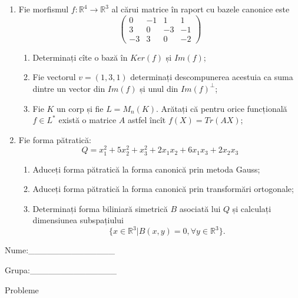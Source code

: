 \documentclass{article}
\begin{document}
\begin{enumerate}
 \item Fie morfismul $f:\mathbb{R}^4 \to \mathbb{R}^3$ al cărui matrice în raport cu bazele canonice este
$$\begin{pmatrix}
0&-1&1&1\\
3&0&-3&-1\\
-3&3&0&-2
\end{pmatrix}$$

\begin{enumerate}
\item Determinați cîte o bază în $Ker(f)$ și $Im(f)$;
\item Fie vectorul $v=(1,3,1)$ determinați descompunerea acestuia ca suma dintre un vector din $Im(f)$ și unul din $Im(f)^\perp$;
\item Fie $K$ un corp și fie $L=M_n(K)$. Arătați că pentru orice funcțională $f \in L^*$ există o matrice $A$ astfel încît $f(X)=Tr(AX)$;
\end{enumerate}
\item Fie forma pătratică:
$$Q= x_1^2+5x_2^2+x_3^2+2x_1x_2+6x_1x_3+2x_2x_3$$

\begin{enumerate}
\item Aduceți forma pătratică la forma canonică prin metoda Gauss;
\item Aduceți forma pătratică la forma canonică prin transformări ortogonale;
\item Determinați forma biliniară simetrică $B$ asociată lui $Q$ și calculați dimensiunea subspațiului
$$\{x \in \mathbb{R}^3 | B(x,y)=0,\forall y \in \mathbb{R}^3\}.$$

\end{enumerate}
\end{enumerate}
\newpage
\begin{flushright}
Nume:\_\_\_\_\_\_\_\_\_\_\_\_\_\_
 
 
Grupa:\_\_\_\_\_\_\_\_\_\_\_\_\_\_
\end{flushright}
\begin{center}
\vspace{2cm}
{\Large Probleme}
\vspace{2cm}
\end{center}
\end{document}
